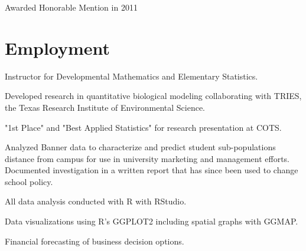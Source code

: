 \documentclass[letterpaper]{deedy-resume} %
\begin{document}
  \begin{tightitemize}
    \item Awarded Honorable Mention in 2011
    
  \end{tightitemize}



\sectionspace
\noindent\makebox[\linewidth]{\rule{\paperwidth}{0.4pt}}
\sectionspace




\section{Employment}

\vspace{\topsep}

\vspace{\topsep}
  \begin{tightitemize}
    \item Instructor for Developmental Mathematics and Elementary Statistics.
    \item Developed research in quantitative biological modeling collaborating with TRIES, the Texas Research Institute of Environmental Science.
    \item "1st Place" and "Best Applied Statistics" for research presentation at COTS.
  \end{tightitemize}
\sectionspace %





\vspace{\topsep}
Analyzed Banner data to characterize and predict student sub-populations distance from campus for use in university marketing and management efforts. Documented investigation in a written report that has since been used to change school policy.
\vspace{\topsep}
 \begin{tightitemize}
    \item All data analysis conducted with R with RStudio.
    \item Data visualizations using R's GGPLOT2 including spatial graphs with GGMAP. 
    \item Financial forecasting of business decision options. 
  \end{tightitemize}
\end{document}
